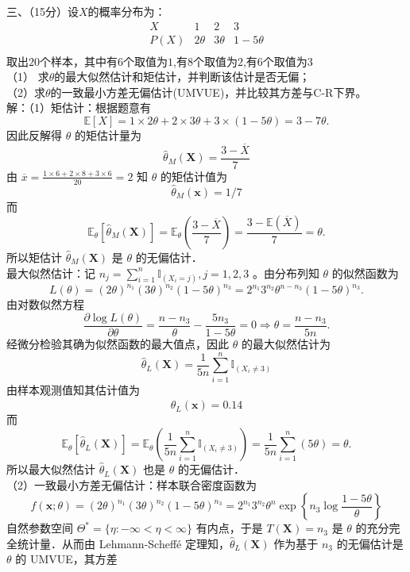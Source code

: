 \documentclass[UTF8,openany]{book}
\begin{document}
	\noindent 三、（15分）设$X$的概率分布为：
	\[
	\begin{array}{c|ccc}
		X & 1 & 2 & 3 \\ \hline
		P(X) & 2\theta & 3\theta & 1-5\theta \\
	\end{array}
	\]
	取出$20$个样本，其中有$6$个取值为$1$,有$8$个取值为$2$,有$6$个取值为$3$\\
	（1） 求$\theta$的最大似然估计和矩估计，并判断该估计是否无偏；\\
	（2）求$\theta$的一致最小方差无偏估计(UMVUE)，并比较其方差与C-R下界。\\
	解：（1）矩估计：根据题意有
	$$
	\mathbb{E}[X]=1 \times 2 \theta+2 \times 3 \theta+3 \times(1-5 \theta)=3-7 \theta .
	$$
	因此反解得 $\theta$ 的矩估计量为
	$$\hat{\theta}_M(\boldsymbol{X})=\frac{3-\overline{X}}{7}$$
	由 $\overline{x}=\frac{1 \times 6+2 \times 8+3 \times 6}{20}=2$ 知 $\theta$ 的矩估计值为 
	$$\hat{\theta}_M(\boldsymbol{x})=1 / 7$$ 而
	$$
	\mathbb{E}_\theta\left[\hat{\theta}_M(\boldsymbol{X})\right]=\mathbb{E}_\theta\left(\frac{3-\overline{X}}{7}\right)=\frac{3-\mathbb{E}(\overline{X})}{7}=\theta .
	$$
	所以矩估计 $\hat{\theta}_M(\boldsymbol{X})$ 是 $\theta$ 的无偏估计．\\
	最大似然估计：记 $n_j=\sum_{i=1}^n \mathbb{I}_{\left(X_i=j\right)}, j=1,2,3$ 。由分布列知 $\theta$ 的似然函数为
	$$
	L(\theta)=(2 \theta)^{n_1}(3 \theta)^{n_2}(1-5 \theta)^{n_3}=2^{n_1} 3^{n_2} \theta^{n-n_3}(1-5 \theta)^{n_3} .
	$$
	由对数似然方程
	$$
	\frac{\partial \log L(\theta)}{\partial \theta}=\frac{n-n_3}{\theta}-\frac{5 n_3}{1-5 \theta}=0 \Rightarrow \theta=\frac{n-n_3}{5 n} .
	$$
	经微分检验其确为似然函数的最大值点，因此 $\theta$ 的最大似然估计为 $$\hat{\theta}_L(\boldsymbol{X})=\frac{1}{5 n} \sum_{i=1}^n \mathbb{I}_{\left(X_i \neq 3\right)}$$
	由样本观测值知其估计值为 $$\hat{\theta}_L(\boldsymbol{x})=0.14$$
	而
	$$
	\mathbb{E}_\theta\left[\hat{\theta}_L(\boldsymbol{X})\right]=\mathbb{E}_\theta\left(\frac{1}{5 n} \sum_{i=1}^n \mathbb{I}_{\left(X_i \neq 3\right)}\right) =\frac{1}{5 n} \sum_{i=1}^n(5 \theta)=\theta .
	$$
	所以最大似然估计 $\hat{\theta}_L(\boldsymbol{X})$ 也是 $\theta$ 的无偏估计．\\
	（2）一致最小方差无偏估计：样本联合密度函数为
	$$
	f(\boldsymbol{x} ; \theta)=(2 \theta)^{n_1}(3 \theta)^{n_2}(1-5 \theta)^{n_3}=2^{n_1} 3^{n_2} \theta^n \exp \left\{n_3 \log \frac{1-5 \theta}{\theta}\right\}
	$$
	自然参数空间 $\Theta^*=\{\eta:-\infty<\eta<\infty\}$ 有内点，于是 $T(\boldsymbol{X})=n_3$ 是 $\theta$ 的充分完全统计量．从而由 Lehmann-Scheffé 定理知，$\hat{\theta}_L(\boldsymbol{X})$ 作为基于 $n_3$ 的无偏估计是 $\theta$ 的 UMVUE，其方差
\end{document}
